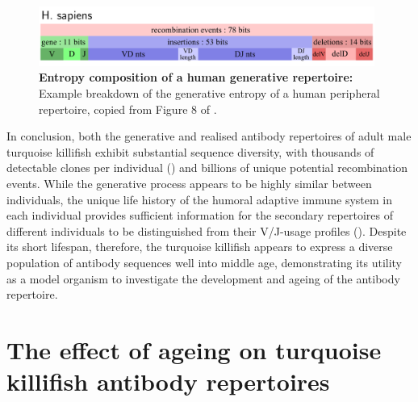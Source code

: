 \begin{figure}
\centering
\includegraphics[width = 0.98\textwidth]{_Figures/png_edited/human-repertoire-entropy.png}
\caption[Entropy composition of a human generative repertoire]{\textbf{Entropy composition of a human generative repertoire:} Example breakdown of the generative entropy of a human peripheral repertoire, copied from Figure 8 of \parencite{elhanati2015model}.} 
\label{fig:igseq-pilot-human-entropies}
\end{figure}

In conclusion, both the generative and realised antibody repertoires of adult male turquoise killifish exhibit substantial sequence diversity, with thousands of detectable clones per individual () and billions of unique potential recombination events. While the generative process appears to be highly similar between individuals, the unique life history of the humoral adaptive immune system in each individual provides sufficient information for the secondary repertoires of different individuals to be distinguished from their V/J-usage profiles (). Despite its short lifespan, therefore, the turquoise killifish appears to express a diverse population of antibody sequences well into middle age, demonstrating its utility as a model organism to investigate the development and ageing of the antibody repertoire.

\FloatBarrier
\clearpage


\section{The effect of ageing on turquoise killifish antibody repertoires}
\label{sec:igseq_ageing}

